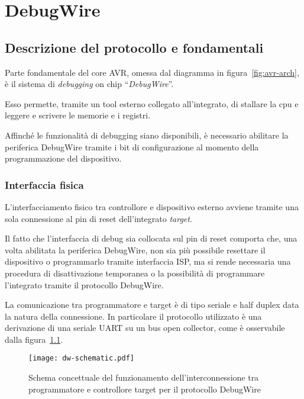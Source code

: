 \chapter{DebugWire}
\section{Descrizione del protocollo e fondamentali}

Parte fondamentale del core AVR, omessa dal diagramma in figura~\ref{fig:avr-arch}, è il sistema di \textit{debugging} on chip ``\textit{DebugWire}''.

Esso permette, tramite un tool esterno collegato all'integrato, di stallare la cpu e leggere e scrivere le memorie e i registri.\cite[sec 25]{avr:m328p}

Affinché le funzionalità di debugging siano disponibili, è necessario abilitare la periferica DebugWire tramite i bit di configurazione al momento della programmazione del dispositivo\cite[tab 28-7]{avr:m328p}.

\subsection{Interfaccia fisica}\label{ss:dw-phy}

L'interfacciamento fisico tra controllore e dispositivo esterno avviene tramite una sola connessione al pin di reset dell'integrato \textit{target}.

Il fatto che l'interfaccia di debug sia collocata sul pin di reset comporta che, una volta abilitata la periferica DebugWire, non sia più possibile resettare il dispositivo o programmarlo tramite interfaccia ISP\cites{avr:appnote:isp}[sec 25.3]{avr:m328p}, ma si rende necessaria una procedura di disattivazione temporanea o la possibilità di programmare l'integrato tramite il protocollo DebugWire.

La comunicazione tra programmatore e target è di tipo seriale e half duplex data la natura della connessione. In particolare il protocollo utilizzato è una derivazione di una seriale UART su un bus open collector, come è osservabile dalla figura~\ref{fig:dw-schematic}\cite{site:dw-reverse-engeneering}.

\begin{figure}[t]
    \centering
    \texttt{[image: dw-schematic.pdf]}
    \caption[]{Schema concettuale del funzionamento dell'interconnessione tra programmatore e controllore target per il protocollo DebugWire}\label{fig:dw-schematic}
\end{figure}


